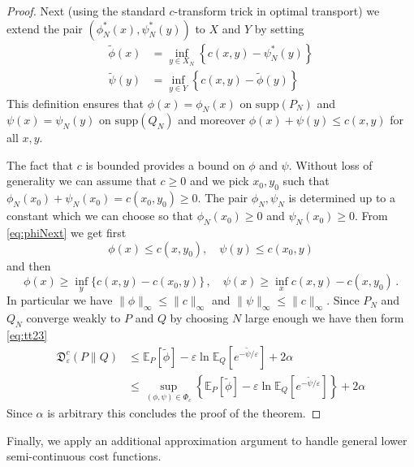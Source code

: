 \documentclass{amsart}
\theoremstyle{definition}
\theoremstyle{remark}
\numberwithin{equation}{section}
\begin{document}
\begin{proof}
Next (using the standard $c$-transform trick in optimal transport) we extend the pair $(\phi_N^*(x),\psi_N^*(y))$ to  $X$ and $Y$ by setting 
\begin{equation}\label{eq:phiNext}
\begin{aligned}
\widetilde{\phi}(x) &= \inf_{y \in X_N} \left\{ c(x,y) - \psi_N^*(y) \right\} \\
\widetilde{\psi}(y) &=\inf_{y \in Y} \left\{ c(x,y) - \widetilde{\phi}(y) \right\}
\end{aligned}
\end{equation}
This definition ensures that $\phi(x)=\phi_N(x)$ on $\textrm{supp}(P_N)$
and $\psi(x)=\psi_N(y)$ on $\textrm{supp}(Q_N)$ and moreover $\phi(x) + \psi(y)\le c(x,y)$ for all $x,y$.  

The fact that $c$ is bounded provides a bound on $\phi$ and $\psi$.  Without loss of generality we can assume that $c\ge 0$
and we pick $x_0,y_0$ such that $\phi_N(x_0)+\psi_N(x_0)=c(x_0,y_0)\ge 0$.  The pair $\phi_N,\psi_N$ is determined up to a constant which we can choose so that $\phi_N(x_0)\ge 0$ and $\psi_N(x_0)\ge 0$. 
From \eqref{eq:phiNext} we get first
\begin{equation}\label{eq:boundbyc1}
\phi(x) \le c(x,y_0), \quad \psi(y) \le c(x_0,y) 
\end{equation}
and then 
\begin{equation}\label{eq:boundbyc2}
\phi(x) \ge \inf_{y} \{c(x,y) - c(x_0,y)\}\,,  \quad \psi(x) \ge  \inf_{x} c(x,y) - c(x,y_0) \,.  
\end{equation}
In particular we have $\|\phi\|_\infty \le \|c\|_\infty$ and $\|\psi\|_\infty \le \|c\|_\infty$.  Since $P_N$ and $Q_N$ converge weakly to $P$ and $Q$ by choosing $N$ large enough we have then form \eqref{eq:tt23}  
\begin{equation}
\begin{aligned}
\mathfrak{D}^c_\varepsilon(P\|Q)  &\le \mathbb{E}_{P}[\widetilde{\phi}] - \varepsilon\ln \mathbb{E}_{Q}[e^{-\widetilde{\psi}/\varepsilon}] + 2 \alpha \\
&\le \sup_{(\phi,\psi)\in \Phi_c}\left\{ \mathbb{E}_{P}[\widetilde{\phi}] - \varepsilon\ln \mathbb{E}_{Q}[e^{-\widetilde{\psi}/\varepsilon}]\right\}  + 2 \alpha 
\end{aligned}
\end{equation} 
Since $\alpha$ is arbitrary this concludes the proof of the theorem.
\end{proof}

Finally, we apply an additional approximation argument to handle general lower semi-continuous cost functions.
\end{document}
